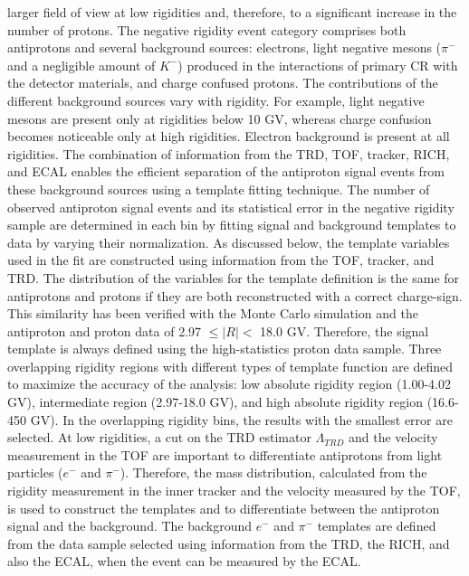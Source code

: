 \documentclass[twocolumn,twoside,slac_two]{revtex4-1}
\begin{document}
larger field of view at low rigidities and, therefore, to a
significant increase in the number of protons.
The negative rigidity event category comprises both
antiprotons and several background sources: electrons,
light negative mesons ($\pi^-$ and a negligible amount of
$K^-$) produced in the interactions of primary CR
with the detector materials, and charge confused protons.
The contributions of the different background sources vary
with rigidity. For example, light negative mesons are
present only at rigidities below 10 GV, whereas charge
confusion becomes noticeable only at high rigidities.
Electron background is present at all rigidities. The
combination of information from the TRD, TOF, tracker,
RICH, and ECAL enables the efficient separation of the
antiproton signal events from these background sources
using a template fitting technique. The number of observed
antiproton signal events and its statistical error in the
negative rigidity sample are determined in each bin by
fitting signal and background templates to data by varying
their normalization. As discussed below, the template
variables used in the fit are constructed using information
from the TOF, tracker, and TRD. The distribution of the
variables for the template definition is the same for
antiprotons and protons if they are both reconstructed with
a correct charge-sign. This similarity has been verified with
the Monte Carlo simulation and the antiproton and
proton data of 2.97 $\leq \vert R \vert <$ 18.0 GV. Therefore, the signal
template is always defined using the high-statistics proton
data sample. Three overlapping rigidity regions with different
types of template function are defined to maximize the
accuracy of the analysis: low absolute rigidity region (1.00-4.02 GV),
intermediate region (2.97-18.0 GV), and high
absolute rigidity region (16.6-450 GV). In the overlapping
rigidity bins, the results with the smallest error are selected.
At low rigidities, a cut on the TRD estimator $\Lambda_{TRD}$ and
the velocity measurement in the TOF are important to
differentiate antiprotons from light particles ($e^-$ and $\pi^-$).
Therefore, the mass distribution, calculated from the
rigidity measurement in the inner tracker and the velocity
measured by the TOF, is used to construct the templates and
to differentiate between the antiproton signal and the
background. The background $e^-$ and $\pi^-$ templates are
defined from the data sample selected using information
from the TRD, the RICH, and also the ECAL, when the
event can be measured by the ECAL.
\end{document}
